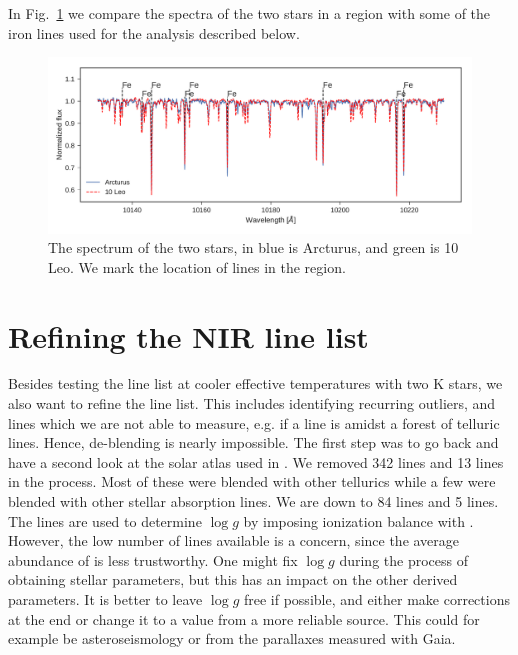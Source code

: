 \documentclass{aa}
\begin{document}
In Fig.~\ref{fig:both} we compare the spectra of the two stars in a region with
some of the iron lines used for the analysis described below.

\begin{figure}[tpb]
    \centering
    \includegraphics[width=1.0\linewidth]{figures/bothspectra.pdf}
    \caption{The spectrum of the two stars, in blue is Arcturus, and green is
             10 Leo. We mark the location of  lines in the region.}
    \label{fig:both}
\end{figure}





\section{Refining the NIR line list}
\label{sec:refining_the_line_list}

Besides testing the line list at cooler effective temperatures with two K stars,
we also want to refine the line list. This includes identifying recurring
outliers, and lines which we are not able to measure, e.g. if a line is amidst a
forest of telluric lines. Hence, de-blending is nearly impossible. The first
step was to go back and have a second look at the solar atlas used in
\citet{Andreasen2016}. We removed 342  lines and 13 
lines in the process. Most of these were blended with other tellurics while a
few were blended with other stellar absorption lines. We are down to 84
 lines and 5  lines. The  lines are used to
determine $\log g$ by imposing ionization balance with . However, the
low number of  lines available is a concern, since the average
abundance of  is less trustworthy. One might fix $\log g$ during the
process of obtaining stellar parameters, but this has an impact on the other
derived parameters. It is better to leave $\log g$ free if possible, and either
make corrections at the end or change it to a value from a more reliable source.
This could for example be asteroseismology or from the parallaxes measured with
Gaia.
\end{document}
